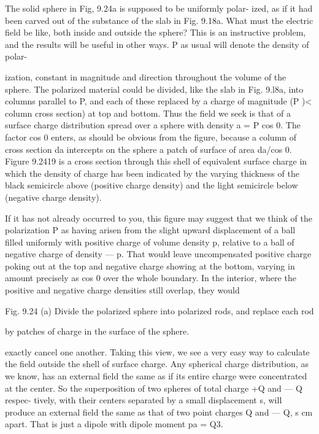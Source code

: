 {The solid sphere in Fig, 9.24a is supposed to be uniformly polar-
ized, as if it had been carved out of the substance of the slab in
Fig. 9.18a. What must the electric field be like, both inside and outside
the sphere? This is an instructive problem, and the results will
be useful in other ways. P as usual will denote the density of polar-

ization, constant in magnitude and direction throughout the volume
of the sphere. The polarized material could be divided, like the slab
in Fig. 9.l8a, into columns parallel to P, and each of these replaced
by a charge of magnitude (P )< column cross section) at top and
bottom. Thus the field we seek is that of a surface charge distribution
spread over a sphere with density a = P cos 0. The factor cos 0
enters, as should be obvious from the figure, because a column of
cross section da intercepts on the sphere a patch of surface of area
da/cos 0. Figure 9.2419 is a cross section through this shell of equivalent
surface charge in which the density of charge has been indicated
by the varying thickness of the black semicircle above (positive
charge density) and the light semicircle below (negative charge
density).

If it has not already occurred to you, this figure may suggest that
we think of the polarization P as having arisen from the slight upward
displacement of a ball filled uniformly with positive charge of
volume density p, relative to a ball of negative charge of density  --- p.
That would leave uncompensated positive charge poking out at the
top and negative charge showing at the bottom, varying in amount
precisely as cos 0 over the whole boundary. In the interior, where
the positive and negative charge densities still overlap, they would

 

Fig. 9.24 (a) Divide the polarized sphere
into polarized rods, and replace each rod

by patches of charge in the surface of the
sphere.

exactly cancel one another. Taking this view, we see a very easy way
to calculate the field outside the shell of surface charge. Any
spherical charge distribution, as we know, has an external field the
same as if its entire charge were concentrated at the center. So the
superposition of two spheres of total charge +Q and  --- Q respec-
tively, with their centers separated by a small displacement s, will
produce an external field the same as that of two point charges Q and
 ---  Q, s cm apart. That is just a dipole with dipole moment pa = Q3.

}
